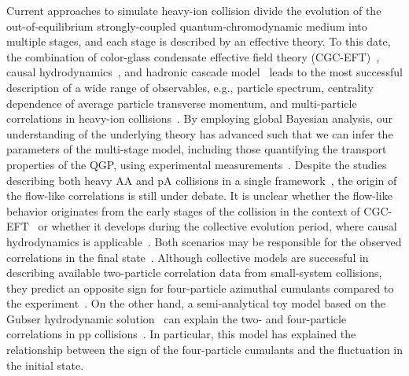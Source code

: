 Current approaches to simulate heavy-ion collision divide the evolution of the out-of-equilibrium strongly-coupled quantum-chromodynamic medium into multiple stages, and each stage is described by an effective theory.  To this date, the combination of color-glass condensate effective field theory (CGC-EFT)~\cite{Schenke:2012wb,Schenke:2012hg}, causal hydrodynamics~\cite{Kolb:2003dz,Song:2007ux,Dusling:2007gi,Holopainen:2010gz,Schenke:2010rr,Romatschke:2007mq,Niemi:2015qia,Jeon:2015dfa,Romatschke:2017ejr}, and hadronic cascade model~\cite{Bass:1998ca,Bleicher:1999xi,Weil:2016zrk} leads to the most successful description of a wide range of observables, e.g., particle spectrum, centrality dependence of average particle transverse momentum, and multi-particle correlations in heavy-ion collisions~\cite{ALICE:2016kpq,Acharya:2017gsw,Acharya:2017zfg,Acharya:2020taj,ALICE:2021klf,ALICE:2021adw,ALICE:2013mez,ALICE:2011ab}. By employing global Bayesian analysis, our understanding of the underlying theory has advanced such that we can infer the parameters of the multi-stage model, including those quantifying the transport properties of the QGP, using experimental measurements~\cite{Bernhard:2016tnd,Bernhard:2019bmu,Parkkila:2021tqq,Parkkila:2021yha}. Despite the studies describing both heavy AA and pA collisions in a single framework~\cite{Moreland:2018gsh}, the origin of the flow-like correlations is still under debate. It is unclear whether the flow-like behavior originates from the early stages of the collision in the context of CGC-EFT~\cite{Dusling:2012cg,Bzdak:2013zma} or whether it develops during the collective evolution period, where causal hydrodynamics is applicable~\cite{Greif:2017bnr,Mantysaari:2017cni}. Both scenarios may be responsible for the observed correlations in the final state~\cite{Greif:2017bnr}. Although collective models are successful in describing available two-particle correlation data from small-system collisions, they predict an opposite sign for four-particle azimuthal cumulants compared to the experiment~\cite{Khachatryan:2016txc,ATLAS:2017rtr,Zhao:2017rgg}. On the other hand, a semi-analytical toy model based on the Gubser hydrodynamic solution~\cite{Gubser:2010ze,Gubser:2010ui} can explain the two- and four-particle correlations in pp collisions~\cite{Taghavi:2019mqz}. In particular, this model has explained the relationship between the sign of the four-particle cumulants and the fluctuation in the initial state. 

